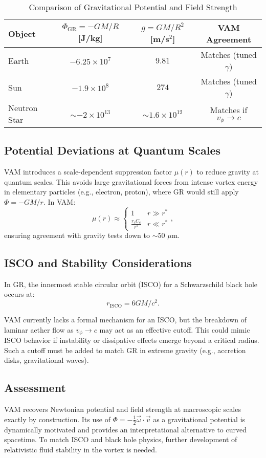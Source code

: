 \begin{table}[H]
    \centering
    \caption{Comparison of Gravitational Potential and Field Strength}
    \begin{tabular}{lccc}
        \toprule
        Object & $\Phi_{\text{GR}} = -GM/R$ [J/kg] & $g = GM/R^2$ [m/s$^2$] & VAM Agreement \\
        \midrule
        Earth & $-6.25\times10^7$ & $9.81$ & Matches (tuned $\gamma$) \\
        Sun & $-1.9\times10^8$ & $274$ & Matches (tuned $\gamma$) \\
        Neutron Star & $\sim -2\times10^{13}$ & $\sim 1.6\times10^{12}$ & Matches if $v_\phi \rightarrow c$ \\
        \bottomrule
    \end{tabular}
\end{table}

\subsection{Potential Deviations at Quantum Scales}
VAM introduces a scale-dependent suppression factor $\mu(r)$ to reduce gravity at quantum scales. This avoids large gravitational forces from intense vortex energy in elementary particles (e.g., electron, proton), where GR would still apply $\Phi = -GM/r$. In VAM:
\begin{equation}
    \mu(r) \approx \begin{cases}
                       1 & r \gg r^* \\
                       \frac{r_c C_e}{r^2} & r \ll r^*
    \end{cases},
\end{equation}
ensuring agreement with gravity tests down to $\sim$50 $\mu$m.

\subsection{ISCO and Stability Considerations}
In GR, the innermost stable circular orbit (ISCO) for a Schwarzschild black hole occurs at:
\begin{equation}
    r_{\text{ISCO}} = 6GM/c^2.
\end{equation}

VAM currently lacks a formal mechanism for an ISCO, but the breakdown of laminar aether flow as $v_\phi \rightarrow c$ may act as an effective cutoff. This could mimic ISCO behavior if instability or dissipative effects emerge beyond a critical radius. Such a cutoff must be added to match GR in extreme gravity (e.g., accretion disks, gravitational waves).

\subsection{Assessment}
VAM recovers Newtonian potential and field strength at macroscopic scales exactly by construction. Its use of $\Phi = -\tfrac{1}{2}\vec{\omega}\cdot\vec{v}$ as a gravitational potential is dynamically motivated and provides an interpretational alternative to curved spacetime. To match ISCO and black hole physics, further development of relativistic fluid stability in the vortex is needed.

